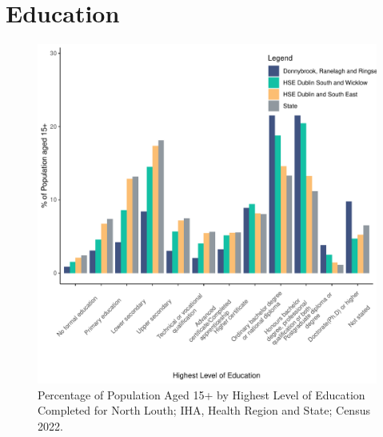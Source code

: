 \documentclass{article}
\begin{document}
\section{Education}\label{sect:Edu}
\begin{figure}[H]
	\centering
	\includegraphics[width = 120mm]{../figures/EduED.pdf}
	\caption{Percentage of Population Aged 15+ by Highest Level of Education Completed for North Louth; IHA, Health Region and State; Census 2022.}
	\label{fig:vbnv}
	\end{figure}
\end{document}
